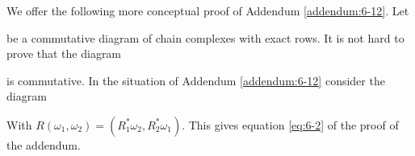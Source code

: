 \begin{remark}\label{remark:6-16}
  We offer the following more conceptual proof of Addendum \ref{addendum:6-12}. Let
  \begin{center}
    \begin{tikzcd}
    \end{tikzcd}
  \end{center}
\end{remark}

\begin{center}
\end{center}

be a commutative diagram of chain complexes with exact rows. It is not hard
to prove that the diagram
\begin{center}
\end{center}

is commutative. In the situation of Addendum \ref{addendum:6-12} consider the diagram
\begin{center}
\end{center}

With $R(\omega_1, \omega_2) = (R^*_1\omega_2, R^*_2\omega_1)$. This gives equation \eqref{eq:6-2} of the proof of the
addendum.